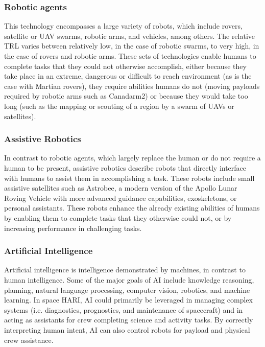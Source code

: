 \subsubsection{Robotic agents}
This technology encompasses a large variety of robots, which include rovers, satellite or UAV swarms, robotic arms, and vehicles, among others.
The relative TRL varies between relatively low, in the case of robotic swarms, to very high, in the case of rovers and robotic arms.
These sets of technologies enable humans to complete tasks that they could not otherwise accomplish, either because they take place in an extreme, dangerous or difficult to reach environment (as is the case with Martian rovers), they require abilities humans do not (moving payloads required by robotic arms such as Canadarm2) or because they would take too long (such as the mapping or scouting of a region by a swarm of UAVs or satellites).

\subsubsection{Assistive Robotics}
In contrast to robotic agents, which largely replace the human or do not require a human to be present, assistive robotics describe robots that directly interface with humans to assist them in accomplishing a task.
These robots include small assistive satellites such as Astrobee, a modern version of the Apollo Lunar Roving Vehicle with more advanced guidance capabilities, exoskeletons, or personal assistants.
These robots enhance the already existing abilities of humans by enabling them to complete tasks that they otherwise could not, or by increasing performance in challenging tasks.

\subsubsection{Artificial Intelligence}
Artificial intelligence is intelligence demonstrated by machines, in contrast to human intelligence.
Some of the major goals of AI include knowledge reasoning, planning, natural language processing, computer vision, robotics, and machine learning.
In space HARI, AI could primarily be leveraged in managing complex systems (i.e. diagnostics, prognostics, and maintenance of spacecraft) and in acting as assistants for crew completing science and activity tasks.
By correctly interpreting human intent, AI can also control robots for payload and physical crew assistance.

